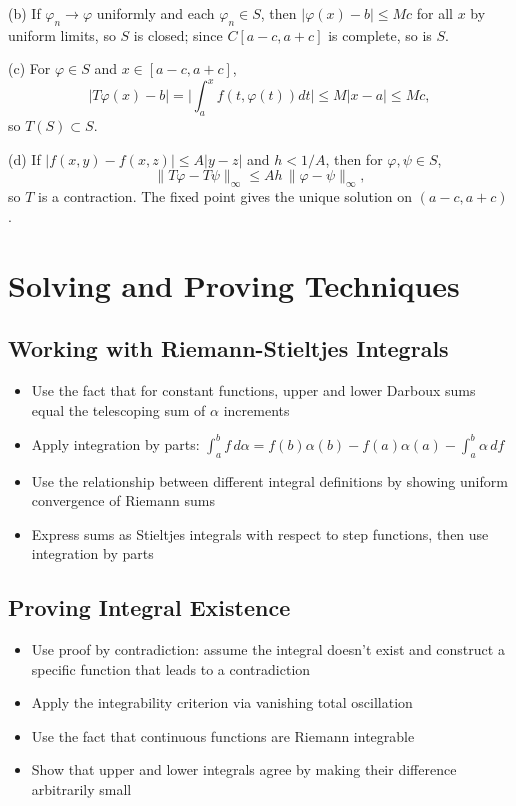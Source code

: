 (b) If $\varphi_n\to\varphi$ uniformly and each $\varphi_n\in S$, then $|\varphi(x)-b|\le Mc$ for all $x$ by uniform limits, so $S$ is closed; since $C[a-c,a+c]$ is complete, so is $S$.

(c) For $\varphi\in S$ and $x\in[a-c,a+c]$,
\[|T\varphi(x)-b|=\Big|\int_a^x f(t,\varphi(t))dt\Big|\le M|x-a|\le Mc,
\]
so $T(S)\subset S$.

(d) If $|f(x,y)-f(x,z)|\le A|y-z|$ and $h<1/A$, then for $\varphi,\psi\in S$,
\[\|T\varphi-T\psi\|_\infty\le A h\,\|\varphi-\psi\|_\infty,
\]
so $T$ is a contraction. The fixed point gives the unique solution on $(a-c,a+c)$.
\medskip

\section{Solving and Proving Techniques}

\subsection*{Working with Riemann-Stieltjes Integrals}
\begin{itemize}
\item Use the fact that for constant functions, upper and lower Darboux sums equal the telescoping sum of $\alpha$ increments
\item Apply integration by parts: $\int_a^b f\,d\alpha = f(b)\alpha(b)-f(a)\alpha(a)-\int_a^b \alpha\,df$
\item Use the relationship between different integral definitions by showing uniform convergence of Riemann sums
\item Express sums as Stieltjes integrals with respect to step functions, then use integration by parts
\end{itemize}

\subsection*{Proving Integral Existence}
\begin{itemize}
\item Use proof by contradiction: assume the integral doesn't exist and construct a specific function that leads to a contradiction
\item Apply the integrability criterion via vanishing total oscillation
\item Use the fact that continuous functions are Riemann integrable
\item Show that upper and lower integrals agree by making their difference arbitrarily small
\end{itemize}

